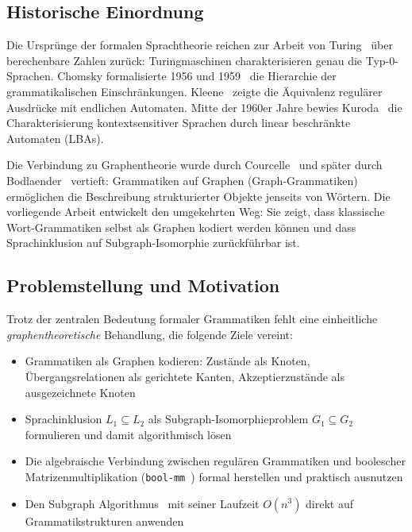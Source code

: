 ﻿\documentclass[a4paper,12pt]{article}
\theoremstyle{definition}
\begin{document}
\subsection{Historische Einordnung}

Die Urspr\"unge der formalen Sprachtheorie reichen zur Arbeit von
Turing~\cite{turing1936} \"uber berechenbare Zahlen zur\"uck:
Turingmaschinen charakterisieren genau die Typ-0-Sprachen. Chomsky formalisierte
1956 und 1959~\cite{chomsky1956,chomsky1959} die Hierarchie der grammatikalischen
Einschr\"ankungen. Kleene~\cite{kleene1956} zeigte die \"Aquivalenz regul\"arer
Ausdr\"ucke mit endlichen Automaten. Mitte der 1960er Jahre bewies Kuroda~\cite{kuroda1964}
die Charakterisierung kontextsensitiver Sprachen durch linear beschr\"ankte
Automaten (LBAs).

Die Verbindung zu Graphentheorie wurde durch Courcelle~\cite{courcelle1990} und
sp\"ater durch Bodlaender~\cite{bodlaender1998} vertieft: Grammatiken auf Graphen
(Graph-Grammatiken) erm\"oglichen die Beschreibung strukturierter Objekte jenseits
von W\"ortern. Die vorliegende Arbeit entwickelt den umgekehrten Weg: Sie zeigt,
dass klassische Wort-Grammatiken selbst als Graphen kodiert werden k\"onnen und
dass Sprachinklusion auf Subgraph-Isomorphie zur\"uckf\"uhrbar ist.

\subsection{Problemstellung und Motivation}

Trotz der zentralen Bedeutung formaler Grammatiken fehlt eine einheitliche
\emph{graphentheoretische} Behandlung, die folgende Ziele vereint:

\begin{itemize}
    \item Grammatiken als Graphen kodieren: Zust\"ande als Knoten,
          \"Ubergangsrelationen als gerichtete Kanten, Akzeptierzust\"ande
          als ausgezeichnete Knoten
    \item Sprachinklusion $L_1 \subseteq L_2$ als Subgraph-Isomorphieproblem
          $G_1 \subseteq G_2$ formulieren und damit algorithmisch l\"osen
    \item Die algebraische Verbindung zwischen regul\"aren Grammatiken und
          boolescher Matrizenmultiplikation (\texttt{bool-mm}~\cite{epp2026boolmm})
          formal herstellen und praktisch ausnutzen
    \item Den Subgraph Algorithmus~\cite{epp2026subgraph} mit seiner
          Laufzeit $O(n^3)$ direkt auf Grammatikstrukturen anwenden
\end{itemize}
\end{document}
